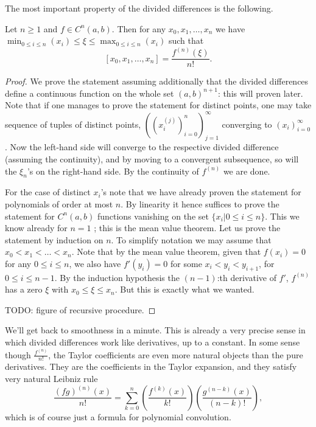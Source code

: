 The most important property of the divided differences is the following.

\begin{lause}
	Let $n \geq 1$ and $f \in C^{n}(a, b)$. Then for any $x_{0}, x_{1}, \ldots, x_{n}$ we have $\min_{0 \leq i \leq n}(x_{i}) \leq \xi \leq \max_{0 \leq i \leq n}(x_{i})$ such that
	\[
		[x_{0}, x_{1}, \ldots, x_{n}] = \frac{f^{(n)}(\xi)}{n!}.
	\]
\end{lause}
\begin{proof}
	We prove the statement assuming additionally that the divided differences define a continuous function on the whole set $(a, b)^{n + 1}$: this will proven later. Note that if one manages to prove the statement for distinct points, one may take sequence of tuples of distinct points, $((x_{i}^{(j)})_{i = 0}^{n})_{j = 1}^{\infty}$ converging to $(x_{i})_{i = 0}^{\infty}$. Now the left-hand side will converge to the respective divided difference (assuming the continuity), and by moving to a convergent subsequence, so will the $\xi_{n}$'s on the right-hand side. By the continuity of $f^{(n)}$ we are done.

	For the case of distinct $x_{i}$'s note that we have already proven the statement for polynomials of order at most $n$. By linearity it hence suffices to prove the statement for $C^{n}(a, b)$ functions vanishing on the set $\{x_{i} | 0 \leq i \leq n\}$. This we know already for $n = 1$ ; this is the mean value theorem. Let us prove the statement by induction on $n$. To simplify notation we may assume that $x_{0} < x_{1} < \ldots < x_{n}$. Note that by the mean value theorem, given that $f(x_{i}) = 0$ for any $0 \leq i \leq n$, we also have $f'(y_{i}) = 0$ for some $x_{i} < y_{i} < y_{i + 1}$, for $0 \leq i \leq n - 1$. By the induction hypothesis the $(n - 1)$:th derivative of $f'$, $f^{(n)}$ has a zero $\xi$ with $x_{0} \leq \xi \leq x_{n}$. But this is exactly what we wanted.

	TODO: figure of recursive procedure.
\end{proof}

We'll get back to smoothness in a minute. This is already a very precise sense in which divided differences work like derivatives, up to a constant. In some sense though $\frac{f^{(n)}}{n!}$, the Taylor coefficients are even more natural objects than the pure derivatives. They are the coefficients in the Taylor expansion, and they satisfy very natural Leibniz rule
\[
	\frac{(f g)^{(n)}(x)}{n!} = \sum_{k = 0}^{n} \left(\frac{f^{(k)}(x)}{k!}\right)\left(\frac{g^{(n - k)}(x)}{(n - k)!}\right),
\]
which is of course just a formula for polynomial convolution.


